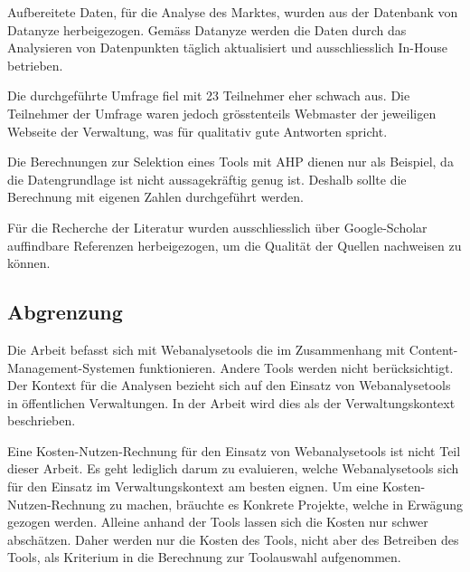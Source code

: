 Aufbereitete Daten, für die Analyse des Marktes, wurden aus der Datenbank von Datanyze \parencite{datanyzeSwitzerlandWebanalytics} herbeigezogen. Gemäss Datanyze \parencite{datanyzeFAQ} werden die Daten durch das Analysieren von Datenpunkten täglich aktualisiert und ausschliesslich In-House betrieben.

Die durchgeführte Umfrage fiel mit 23 Teilnehmer eher schwach aus. Die Teilnehmer der Umfrage waren jedoch grösstenteils Webmaster der jeweiligen Webseite der Verwaltung, was für qualitativ gute Antworten spricht.

Die Berechnungen zur Selektion eines Tools mit AHP dienen nur als Beispiel, da die Datengrundlage ist nicht aussagekräftig genug ist. Deshalb sollte die Berechnung mit eigenen Zahlen durchgeführt werden. 

Für die Recherche der Literatur wurden ausschliesslich über Google-Scholar auffindbare Referenzen herbeigezogen, um die Qualität der Quellen nachweisen zu können.
\newpage
\subsection{Abgrenzung}
Die Arbeit befasst sich mit Webanalysetools die im Zusammenhang mit Content-Management-Systemen funktionieren. Andere Tools werden nicht berücksichtigt. Der Kontext für die Analysen bezieht sich auf den Einsatz von Webanalysetools in öffentlichen Verwaltungen. In der Arbeit wird dies als der Verwaltungskontext beschrieben. 

Eine Kosten-Nutzen-Rechnung für den Einsatz von Webanalysetools ist nicht Teil dieser Arbeit. Es geht lediglich darum zu evaluieren, welche Webanalysetools sich für den Einsatz im Verwaltungskontext am besten eignen. Um eine Kosten-Nutzen-Rechnung zu machen, bräuchte es Konkrete Projekte, welche in Erwägung gezogen werden. Alleine anhand der Tools lassen sich die Kosten nur schwer abschätzen. Daher werden nur die Kosten des  Tools, nicht aber des Betreiben des Tools, als Kriterium in die Berechnung zur Toolauswahl aufgenommen. 